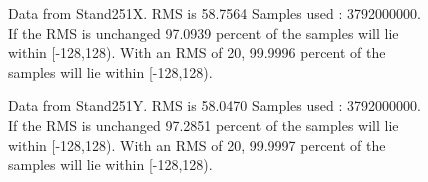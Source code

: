 \begin{figure}[h] 				 				 				\caption{Data from Stand251X. RMS is 58.7564 Samples used : 3792000000. If the RMS is unchanged 97.0939 percent of the samples will lie within [-128,128).  				 With an RMS of 20, 99.9996 percent of the samples will lie within [-128,128).} 				\end{figure} 

\begin{figure}[h] 				 				 				\caption{Data from Stand251Y. RMS is 58.0470 Samples used : 3792000000. If the RMS is unchanged 97.2851 percent of the samples will lie within [-128,128).  				 With an RMS of 20, 99.9997 percent of the samples will lie within [-128,128).} 				\end{figure} 

